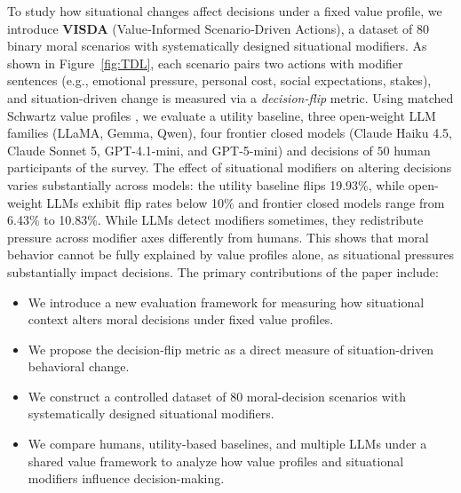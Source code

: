 \documentclass[11pt]{article}
\begin{document}
To study how situational changes affect decisions under a fixed value profile, we introduce \textbf{VISDA} (Value‑Informed Scenario‑Driven Actions), a dataset of 80 binary moral scenarios with systematically designed situational modifiers.
As shown in Figure~\ref{fig:TDL}, each scenario pairs two actions with modifier sentences (e.g., emotional pressure, personal cost, social expectations, stakes), and situation-driven change is measured via a \emph{decision-flip} metric.
Using matched Schwartz value profiles \citep{schwartz1992universals}, we evaluate a utility baseline, three open‑weight LLM families (LLaMA, Gemma, Qwen), four frontier closed models (Claude Haiku 4.5, Claude Sonnet 5, GPT-4.1-mini, and GPT-5-mini) and decisions of $50$ human participants of the survey. 
The effect of situational modifiers on altering decisions varies substantially across models: the utility baseline flips 19.93\%, while open-weight LLMs exhibit flip rates below 10\% and frontier closed models range from 6.43\% to 10.83\%.
While LLMs detect modifiers sometimes, they redistribute pressure across modifier axes differently from humans.
This shows that moral behavior cannot be fully explained by value profiles alone, as situational pressures substantially impact decisions.
The primary contributions of the paper include:
\begin{itemize}[leftmargin=*,noitemsep, topsep=0pt]
    \item We introduce a new evaluation framework for measuring how situational context alters moral decisions under fixed value profiles.
    \item We propose the decision-flip metric as a direct measure of situation-driven behavioral change.
    \item We construct a controlled dataset of 80 moral-decision scenarios with systematically designed situational modifiers.
    \item We compare humans, utility-based baselines, and multiple LLMs under a shared value framework to analyze how value profiles and situational modifiers influence decision-making.
\end{itemize}


\end{document}
